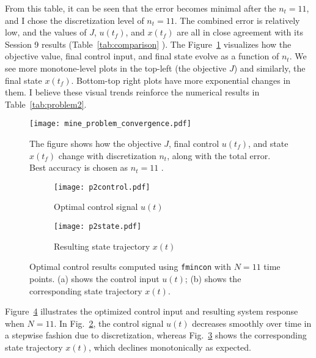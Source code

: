 \documentclass{article}
\begin{document}
From this table, it can be seen that the error becomes minimal after the \(n_t = 11\), and I chose the discretization level of \(n_t = 11\). The combined error is relatively low, and the values of \(J\), \(u(t_f)\), and \(x(t_f)\) are all in close agreement with its Session 9 results (Table~\ref{tab:comparison} ).
The Figure~\ref{fig:convergence} visualizes how the objective value, final control input, and final state evolve as a function of \(n_t\). We see more monotone-level plots in the top-left (the objective \(J\)) and similarly, the final state \(x(t_f)\).  Bottom-top right plots have more exponential changes in them. I believe these visual trends reinforce the numerical results in Table~\ref{tab:problem2}.
\begin{figure}[h]
    \centering
    \texttt{[image: mine\_problem\_convergence.pdf]}
    \caption{
    The figure shows how the objective \(J\), final control \(u(t_f)\), and state \(x(t_f)\) change with discretization \(n_t\), along with the total error. Best accuracy is chosen as \(n_t = 11\) .
}

    \label{fig:convergence}
\end{figure}







\begin{figure}[H]
    \centering
    \begin{subfigure}[t]{0.48\textwidth}
        \centering
        \texttt{[image: p2control.pdf]}
        \caption{Optimal control signal $u(t)$}
        \label{fig:p2a_control}
    \end{subfigure}
    \hfill
    \begin{subfigure}[t]{0.48\textwidth}
        \centering
        \texttt{[image: p2state.pdf]}
        \caption{Resulting state trajectory $x(t)$}
        \label{fig:p2a_state}
    \end{subfigure}
    \caption{Optimal control results computed using \texttt{fmincon} with $N = 11$ time points. 
    (a) shows the control input $u(t)$; (b) shows the corresponding state trajectory $x(t)$.}
    \label{fig:p2a_results}
\end{figure}

Figure~\ref{fig:p2a_results} illustrates the optimized control input and resulting system response when $N = 11$. In Fig.~\ref{fig:p2a_control}, the control signal $u(t)$ decreases smoothly over time in a stepwise fashion due to discretization, whereas Fig.~\ref{fig:p2a_state} shows the corresponding state trajectory $x(t)$, which declines monotonically as expected. 
\end{document}
